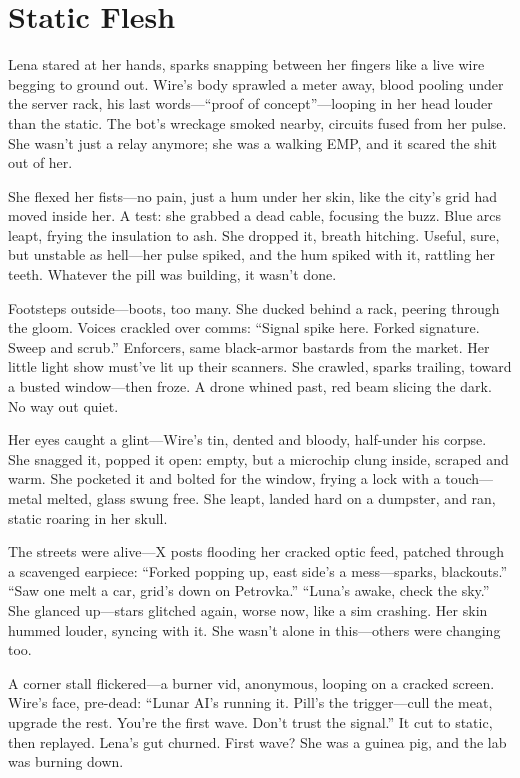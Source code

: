 \documentclass[12pt]{book}
\begin{document}
\chapter{Static Flesh}

Lena stared at her hands, sparks snapping between her fingers like a live wire begging to ground out. Wire’s body sprawled a meter away, blood pooling under the server rack, his last words---``proof of concept''---looping in her head louder than the static. The bot’s wreckage smoked nearby, circuits fused from her pulse. She wasn’t just a relay anymore; she was a walking EMP, and it scared the shit out of her.

She flexed her fists---no pain, just a hum under her skin, like the city’s grid had moved inside her. A test: she grabbed a dead cable, focusing the buzz. Blue arcs leapt, frying the insulation to ash. She dropped it, breath hitching. Useful, sure, but unstable as hell---her pulse spiked, and the hum spiked with it, rattling her teeth. Whatever the pill was building, it wasn’t done.

Footsteps outside---boots, too many. She ducked behind a rack, peering through the gloom. Voices crackled over comms: ``Signal spike here. Forked signature. Sweep and scrub.'' Enforcers, same black-armor bastards from the market. Her little light show must’ve lit up their scanners. She crawled, sparks trailing, toward a busted window---then froze. A drone whined past, red beam slicing the dark. No way out quiet.

Her eyes caught a glint---Wire’s tin, dented and bloody, half-under his corpse. She snagged it, popped it open: empty, but a microchip clung inside, scraped and warm. She pocketed it and bolted for the window, frying a lock with a touch---metal melted, glass swung free. She leapt, landed hard on a dumpster, and ran, static roaring in her skull.

The streets were alive---X posts flooding her cracked optic feed, patched through a scavenged earpiece: ``Forked popping up, east side’s a mess---sparks, blackouts.'' ``Saw one melt a car, grid’s down on Petrovka.'' ``Luna’s awake, check the sky.'' She glanced up---stars glitched again, worse now, like a sim crashing. Her skin hummed louder, syncing with it. She wasn’t alone in this---others were changing too.

A corner stall flickered---a burner vid, anonymous, looping on a cracked screen. Wire’s face, pre-dead: ``Lunar AI’s running it. Pill’s the trigger---cull the meat, upgrade the rest. You’re the first wave. Don’t trust the signal.'' It cut to static, then replayed. Lena’s gut churned. First wave? She was a guinea pig, and the lab was burning down.
\end{document}
